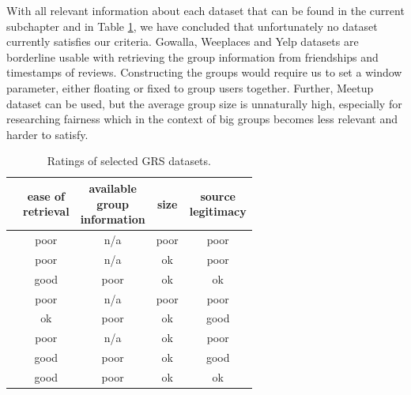With all relevant information about each dataset that can be found in the current subchapter and in Table \ref{table:5.2_GRS_datasets_rating}, we have concluded that
unfortunately no dataset currently satisfies our criteria. Gowalla, Weeplaces and Yelp datasets are borderline usable with retrieving the group information from friendships and timestamps of reviews. Constructing the groups would require us to set a window parameter, either floating or fixed to group users together. Further, Meetup dataset can be used, but the average group size is unnaturally high, especially for researching fairness which in the context of big groups becomes less relevant and harder to satisfy.

\begin{table}[!ht]
    \centering
    \begin{tabular}{ r | c c c c}
         & \makecell[c]{ease of \\ retrieval} & \makecell[c]{available \\ group \\ information} & size & \makecell[c]{source \\ legitimacy}\\
        \hline
            \nameref{subsubsec:04_group_datasets.overview.camra}
                & poor & n/a & poor & poor\\
            \nameref{subsubsec:04_group_datasets.overview.douban}
                & poor & n/a & ok & poor \\
            \nameref{subsubsec:04_group_datasets.overview.gowalla}
                & good & poor & ok &  ok\\
            \nameref{subsubsec:04_group_datasets.overview.mafengwo}
                & poor & n/a & poor & poor\\
            \nameref{subsubsec:04_group_datasets.overview.meetup}
                & ok & poor & ok & good\\
            \nameref{subsubsec:04_group_datasets.overview.plancast}
                & poor & n/a & ok & poor\\
            \nameref{subsubsec:04_group_datasets.overview.yelp}
                & good & poor & ok & good\\
            \nameref{subsubsec:04_group_datasets.overview.weeplaces}
                &  good & poor & ok & ok\\
    \end{tabular}
    \caption{Ratings of selected GRS datasets.}
    \label{table:5.2_GRS_datasets_rating}
\end{table}

